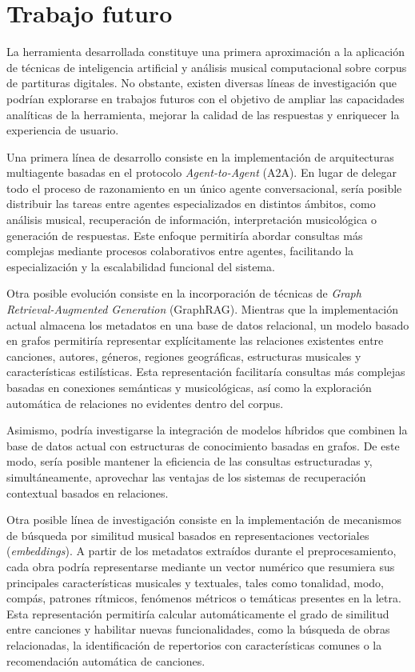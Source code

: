 \section{Trabajo futuro}
La herramienta desarrollada constituye una primera aproximación a la aplicación de técnicas de inteligencia artificial y análisis musical computacional sobre corpus de partituras digitales. No obstante, existen diversas líneas de investigación que podrían explorarse en trabajos futuros con el objetivo de ampliar las capacidades analíticas de la herramienta, mejorar la calidad de las respuestas y enriquecer la experiencia de usuario.

Una primera línea de desarrollo consiste en la implementación de arquitecturas multiagente basadas en el protocolo \textit{Agent-to-Agent} (A2A). En lugar de delegar todo el proceso de razonamiento en un único agente conversacional, sería posible distribuir las tareas entre agentes especializados en distintos ámbitos, como análisis musical, recuperación de información, interpretación musicológica o generación de respuestas. Este enfoque permitiría abordar consultas más complejas mediante procesos colaborativos entre agentes, facilitando la especialización y la escalabilidad funcional del sistema.

Otra posible evolución consiste en la incorporación de técnicas de \textit{Graph Retrieval-Augmented Generation} (GraphRAG). Mientras que la implementación actual almacena los metadatos en una base de datos relacional, un modelo basado en grafos permitiría representar explícitamente las relaciones existentes entre canciones, autores, géneros, regiones geográficas, estructuras musicales y características estilísticas. Esta representación facilitaría consultas más complejas basadas en conexiones semánticas y musicológicas, así como la exploración automática de relaciones no evidentes dentro del corpus.

Asimismo, podría investigarse la integración de modelos híbridos que combinen la base de datos actual con estructuras de conocimiento basadas en grafos. De este modo, sería posible mantener la eficiencia de las consultas estructuradas y, simultáneamente, aprovechar las ventajas de los sistemas de recuperación contextual basados en relaciones.

Otra posible línea de investigación consiste en la implementación de mecanismos de búsqueda por similitud musical basados en representaciones vectoriales (\textit{embeddings}). A partir de los metadatos extraídos durante el preprocesamiento, cada obra podría representarse mediante un vector numérico que resumiera sus principales características musicales y textuales, tales como tonalidad, modo, compás, patrones rítmicos, fenómenos métricos o temáticas presentes en la letra. Esta representación permitiría calcular automáticamente el grado de similitud entre canciones y habilitar nuevas funcionalidades, como la búsqueda de obras relacionadas, la identificación de repertorios con características comunes o la recomendación automática de canciones.

